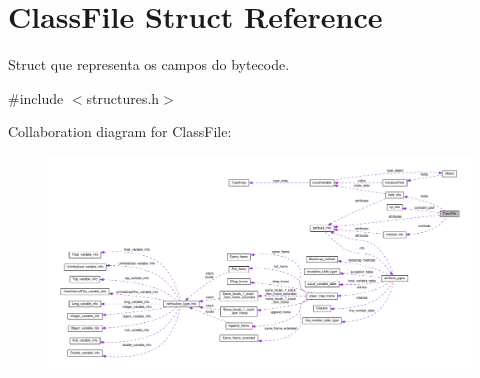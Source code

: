 \hypertarget{structClassFile}{}\section{Class\+File Struct Reference}
\label{structClassFile}


Struct que representa os campos do bytecode.  




{\ttfamily \#include $<$structures.\+h$>$}



Collaboration diagram for Class\+File\+:
\nopagebreak
\begin{figure}[H]
\begin{center}
\leavevmode
\includegraphics[width=350pt]{structClassFile__coll__graph}
\end{center}
\end{figure}
